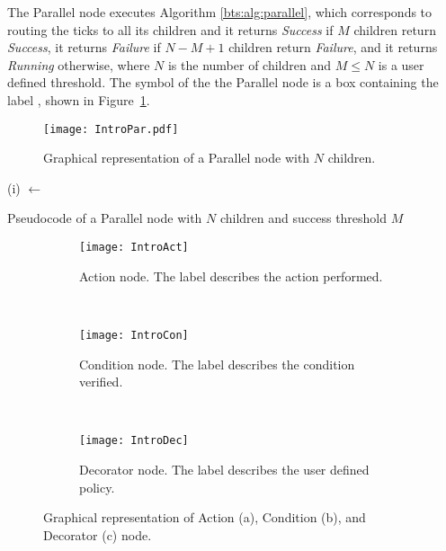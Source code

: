 The Parallel node executes Algorithm \ref{bts:alg:parallel},
which corresponds to routing the ticks to all its children and it returns \emph{Success} if $M$ children return \emph{Success}, it returns \emph{Failure} if $N-M+1$ children return \emph{Failure}, and it returns \emph{Running} otherwise, where $N$ is the number of children and $M\leq N$ is a user defined threshold.
The symbol of the the Parallel node is  a box containing the label \say{$\rightrightarrows$}, shown in Figure~\ref{bts.fig.par}.
\begin{figure}[h]
\centering
\texttt{[image: IntroPar.pdf]}
\caption{Graphical representation of a Parallel node with $N$ children.}
\label{bts.fig.par}
\end{figure}

\begin{algorithm2e}[h]
  {
    (i) $\gets$ \\
    }
    {
    }
    {
    
  }
    \caption{Pseudocode of a Parallel node with $N$ children and success threshold $M$}
  \label{bts:alg:parallel}
\end{algorithm2e}




\begin{figure}[h]
        \centering
        \begin{subfigure}[b]{0.3\columnwidth}
                \centering
                \texttt{[image: IntroAct]}
                \caption{Action node. The label describes the action performed.}
                \label{bts.fig.act}              
        \end{subfigure}
        ~
                \begin{subfigure}[b]{0.3\columnwidth}
                \centering
                \texttt{[image: IntroCon]}
                \caption{Condition node. The label describes the condition verified.}
                \label{bts.fig.cond}
        \end{subfigure}
        ~
         \begin{subfigure}[b]{0.3\columnwidth}
                \centering
                \texttt{[image: IntroDec]}
                \caption{Decorator node. The label describes the user defined policy.}
                \label{bts.fig.dec}
        \end{subfigure}%
        \caption{Graphical representation of  Action (a), Condition (b), and Decorator (c) node.}
\end{figure}



